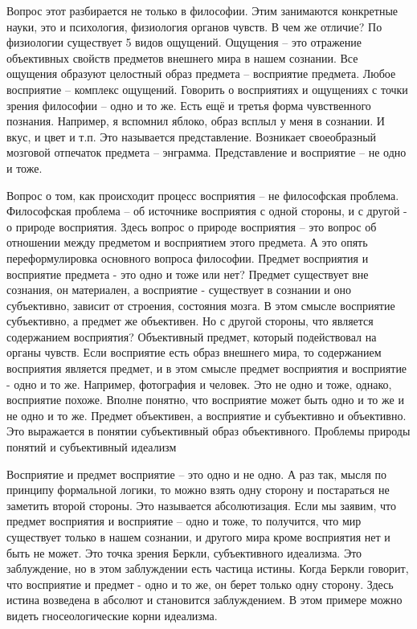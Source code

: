 Вопрос этот разбирается не только в философии. Этим занимаются конкретные науки, это и психология, физиология органов чувств. В чем же отличие? По физиологии существует 5 видов ощущений. Ощущения – это отражение объективных свойств предметов внешнего мира в нашем сознании. Все ощущения образуют целостный образ предмета – восприятие предмета. Любое восприятие – комплекс ощущений. Говорить о восприятиях и ощущениях с точки зрения философии – одно и то же. Есть ещё и третья форма чувственного познания. Например, я вспомнил яблоко, образ всплыл у меня в сознании. И вкус, и цвет и т.п. Это называется представление. Возникает своеобразный мозговой отпечаток предмета – энграмма. Представление и восприятие – не одно и тоже.

Вопрос о том, как происходит процесс восприятия – не философская проблема. Философская проблема – об источнике восприятия с одной стороны, и с другой - о природе восприятия. Здесь вопрос о природе восприятия – это вопрос об отношении между предметом и восприятием этого предмета. А это опять переформулировка основного вопроса философии. Предмет восприятия и восприятие предмета - это одно и тоже или нет? Предмет существует вне сознания, он материален, а восприятие - существует в сознании и оно субъективно, зависит от строения, состояния мозга. В этом смысле восприятие субъективно, а предмет же объективен. Но с другой стороны, что является содержанием восприятия? Объективный предмет, который подействовал на органы чувств. Если восприятие есть образ внешнего мира, то содержанием восприятия является предмет, и в этом смысле предмет восприятия и восприятие - одно и то же. Например, фотография и человек. Это не одно и тоже, однако, восприятие похоже. Вполне понятно, что восприятие может быть одно и то же и не одно и то же. Предмет объективен, а восприятие и субъективно и объективно. Это выражается в понятии субъективный образ объективного.
Проблемы природы понятий и субъективный идеализм

Восприятие и предмет восприятие – это одно и не одно. А раз так, мысля по принципу формальной логики, то можно взять одну сторону и постараться не заметить второй стороны. Это называется абсолютизация. Если мы заявим, что предмет восприятия и восприятие – одно и тоже, то получится, что мир существует только в нашем сознании, и другого мира кроме восприятия нет и быть не может. Это точка зрения Беркли, субъективного идеализма. Это заблуждение, но в этом заблуждении есть частица истины. Когда Беркли говорит, что восприятие и предмет - одно и то же, он берет только одну сторону. Здесь истина возведена в абсолют и становится заблуждением. В этом примере можно видеть гносеологические корни идеализма.

